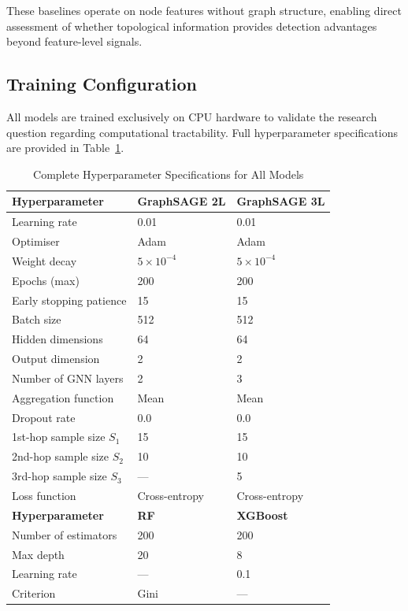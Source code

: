 \documentclass[conference]{IEEEtran}
\begin{document}
These baselines operate on node features without graph structure, enabling
direct assessment of whether topological information provides detection
advantages beyond feature-level signals.

\subsection{Training Configuration}

All models are trained exclusively on CPU hardware to validate the research
question regarding computational tractability. Full hyperparameter
specifications are provided in Table~\ref{tab:hyperparams}.

\begin{table}[htbp]
\centering
\caption{Complete Hyperparameter Specifications for All Models}
\label{tab:hyperparams}
\renewcommand{\arraystretch}{1.2}
\begin{tabular}{lll}
\toprule
\textbf{Hyperparameter} & \textbf{GraphSAGE 2L} & \textbf{GraphSAGE 3L} \\
\midrule
Learning rate & 0.01 & 0.01 \\
Optimiser & Adam & Adam \\
Weight decay & $5 \times 10^{-4}$ & $5 \times 10^{-4}$ \\
Epochs (max) & 200 & 200 \\
Early stopping patience & 15 & 15 \\
Batch size & 512 & 512 \\
Hidden dimensions & 64 & 64 \\
Output dimension & 2 & 2 \\
Number of GNN layers & 2 & 3 \\
Aggregation function & Mean & Mean \\
Dropout rate & 0.0 & 0.0 \\
1st-hop sample size $S_1$ & 15 & 15 \\
2nd-hop sample size $S_2$ & 10 & 10 \\
3rd-hop sample size $S_3$ & --- & 5 \\
Loss function & Cross-entropy & Cross-entropy \\
\midrule
\textbf{Hyperparameter} & \textbf{RF} & \textbf{XGBoost} \\
\midrule
Number of estimators & 200 & 200 \\
Max depth & 20 & 8 \\
Learning rate & --- & 0.1 \\
Criterion & Gini & --- \\

\end{tabular}
\end{table}
\end{document}
